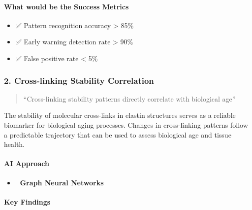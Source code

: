 \paragraph{What would be the Success
Metrics}\label{what-would-be-the-success-metrics}

\begin{itemize}
\tightlist
\item
  ✅ Pattern recognition accuracy \textgreater{} 85\%
\item
  ✅ Early warning detection rate \textgreater{} 90\%
\item
  ✅ False positive rate \textless{} 5\%
\end{itemize}

\subsubsection{2. Cross-linking Stability
Correlation}\label{cross-linking-stability-correlation}

\begin{quote}
``Cross-linking stability patterns directly correlate with biological
age''
\end{quote}

The stability of molecular cross-links in elastin structures serves as a
reliable biomarker for biological aging processes. Changes in
cross-linking patterns follow a predictable trajectory that can be used
to assess biological age and tissue health.

\paragraph{AI Approach}\label{ai-approach-1}

\begin{itemize}
\item
  🔄 \textbf{Graph Neural Networks}

\begin{Shaded}
\begin{Highlighting}[]
\end{Highlighting}
\end{Shaded}
\end{itemize}

\paragraph{Key Findings}\label{key-findings}

